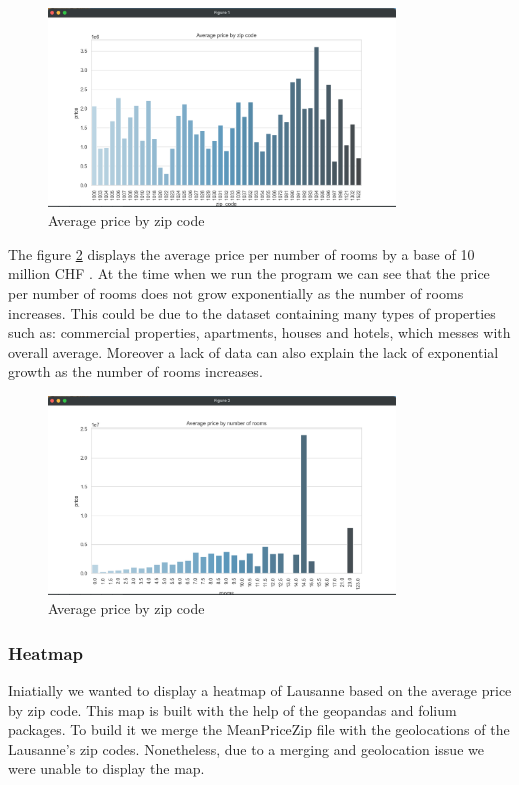 \documentclass[main]{subfiles}
\begin{document}
\begin{figure}[htbp]
    \centerline{
        \includegraphics[width = 92mm]{prog_11.png}}
    \caption{Average price by zip code}
    \label{fig:pricebyzip}
\end{figure}


The figure \ref{fig:pricebyrooms} displays the average price per number of rooms by a base of 10 million CHF . 
At the time when we run the program we can see that the price per number of rooms does not grow exponentially as the number of rooms increases.
This could be due to the dataset containing many types of properties such as: commercial properties, apartments, houses and hotels, which messes with overall average. 
Moreover a lack of data can also explain the lack of exponential growth as the number of rooms increases. 

\begin{figure}[htbp]
    \centerline{
        \includegraphics[width = 92mm]{prog_12.png}}
    \caption{Average price by zip code}
    \label{fig:pricebyrooms}
\end{figure}

\subsubsection{Heatmap}
Iniatially we wanted to display a heatmap of Lausanne based on the average price by zip code. 
This map is built with the help of the geopandas and folium packages. 
To build it we merge the MeanPriceZip file with the geolocations of the Lausanne's zip codes. Nonetheless, 
due to a merging and geolocation issue we were unable to display the map. 
\end{document}

